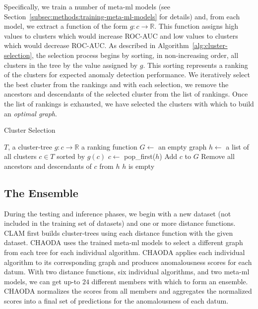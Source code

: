 Specifically, we train a number of meta-ml models (see Section~\ref{subsec:methods:training-meta-ml-models} for details) and, from each model, we extract a function of the form $g : c \rightarrow \mathbb{R}$.
This function assigns high values to clusters which would increase ROC-AUC and low values to clusters which would decrease ROC-AUC.
As described in Algorithm~\ref{alg:cluster-selection}, the selection process begins by sorting, in non-increasing order, all clusters in the tree by the value assigned by $g$.
This sorting represents a ranking of the clusters for expected anomaly detection performance.
We iteratively select the best cluster from the rankings and with each selection, we remove the ancestors and descendants of the selected cluster from the list of rankings.
Once the list of rankings is exhausted, we have selected the clusters with which to build an \textit{optimal graph}.

\begin{algorithm}[h]
    \caption{Cluster Selection}
    \label{alg:cluster-selection}
\begin{algorithmic}[1]
    \REQUIRE $T$, a cluster-tree
    \REQUIRE $g : c \rightarrow \mathbb{R}$ a ranking function
    \STATE $G \gets$ an empty graph
    \STATE $h \gets$ a list of all clusters $c \in T$ sorted by $g(c)$
    \REPEAT
        \STATE $c \gets$ pop\_first($h$)
        \STATE Add $c$ to $G$
        \STATE Remove all ancestors and descendants of $c$ from $h$
    \UNTIL $h$ is empty
\end{algorithmic}
\end{algorithm}


\subsection{The Ensemble}
\label{subsec:methods:the-ensemble}

During the testing and inference phases, we begin with a new dataset (not included in the training set of datasets) and one or more distance functions.
CLAM first builds cluster-trees using each distance function with the given dataset.
CHAODA uses the trained meta-ml models to select a different graph from each tree for each individual algorithm.
CHAODA applies each individual algorithm to its corresponding graph and produces anomalousness scores for each datum.
With two distance functions, six individual algorithms, and two meta-ml models, we can get up-to $24$ different members with which to form an ensemble.
CHAODA normalizes the scores from all members and aggregates the normalized scores into a final set of predictions for the anomalousness of each datum.


